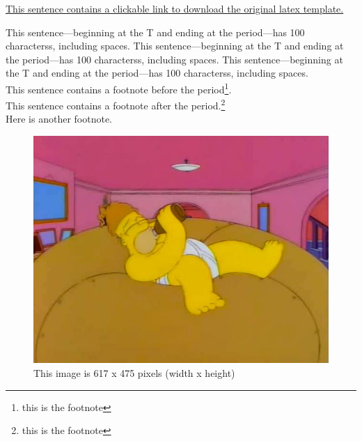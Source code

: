 \documentclass[utf8]{my_class_1_frontiers_vanc}  %
\begin{document}
\href{https://www.frontiersin.org/design/zip/Frontiers_LaTeX_Templates.zip}{This sentence contains a clickable link to download the original latex template.}

This sentence---beginning at the T and ending at the period---has 100 characterss, including spaces.\cite{article}
This sentence---beginning at the T and ending at the period---has 100 characterss, including spaces.\cite{book}
This sentence---beginning at the T and ending at the period---has 100 characterss, including spaces.\\
This sentence contains a footnote before the period\footnote{this is the footnote}.\\
This sentence contains a footnote after the period.\footnote{this is the footnote}\\
Here is another footnote.


\begin{figure}[htbp]
        \begin{center}
        \includegraphics[width=\linewidth]{homer_giant_donut.jpg}
        \end{center}
    \caption{ This image is 617 x 475 pixels (width x height) }\label{fig:homer_giant_donut}
\end{figure}

\end{document}
